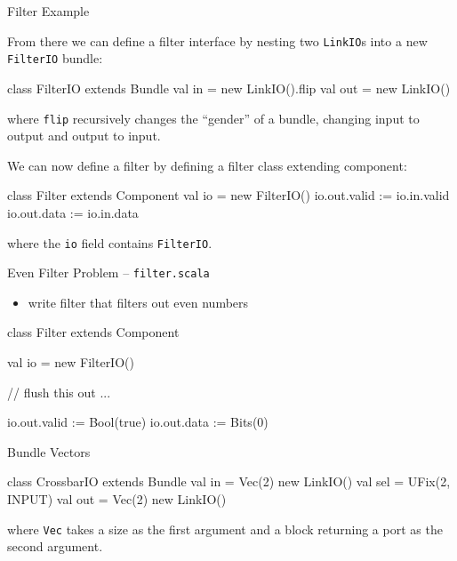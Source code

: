 \documentclass[xcolor=pdflatex,dvipsnames,table]{beamer}
\newcommand{\code}[1]{\begin{footnotesize}{\tt #1}\end{footnotesize}}
\begin{document}
\begin{frame}[fragile]{Filter Example}

From there we can define a filter interface by nesting two
\verb+LinkIO+s into a new \verb+FilterIO+ bundle:

\begin{scala}
class FilterIO extends Bundle { 
  val in  = new LinkIO().flip
  val out = new LinkIO()
}
\end{scala}

\noindent
where \verb+flip+ recursively changes the ``gender'' of a bundle,
changing input to output and output to input.

We can now define a filter by defining a filter class extending component:

\begin{scala}
class Filter extends Component { 
  val io  = new FilterIO()
  io.out.valid := io.in.valid
  io.out.data  := io.in.data
}
\end{scala}

\noindent 
where the \verb+io+ field contains \verb+FilterIO+. 

\end{frame}

\begin{frame}[fragile]{Even Filter Problem -- \tt filter.scala}
\begin{itemize}
\item write filter that filters out even numbers
\end{itemize}
\begin{scala}
class Filter extends Component { 
  val io  = new FilterIO()

  // flush this out ...

  io.out.valid := Bool(true)
  io.out.data  := Bits(0)
}
\end{scala}
\end{frame}

\begin{frame}[fragile]{Bundle Vectors}

\begin{scala}
class CrossbarIO extends Bundle {
  val in  = Vec(2){ new LinkIO() }
  val sel = UFix(2, INPUT)
  val out = Vec(2){ new LinkIO() }
}
\end{scala}

\noindent
where \verb+Vec+ takes a size as the first argument and a block
returning a port as the second argument.

\end{frame}
\end{document}

